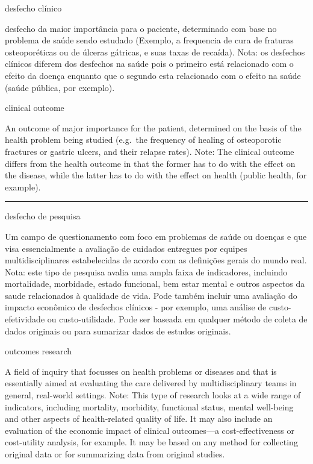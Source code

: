 \documentclass[
]{book}
\begin{document}
desfecho clínico

desfecho da maior importância para o paciente, determinado com base no problema de saúde sendo estudado (Exemplo, a frequencia de cura de fraturas osteoporéticas ou de úlceras gátricas, e suas taxas de recaída). Nota: os desfechos clínicos diferem dos desfechos na saúde pois o primeiro está relacionado com o efeito da doença enquanto que o segundo esta relacionado com o efeito na saúde (saúde pública, por exemplo).

clinical outcome

An outcome of major importance for the patient, determined on the basis of the health problem being studied (e.g.~the frequency of healing of osteoporotic fractures or gastric ulcers, and their relapse rates). Note: The clinical outcome differs from the health outcome in that the former has to do with the effect on the disease, while the latter has to do with the effect on health (public health, for example).

\begin{center}\rule{0.5\linewidth}{0.5pt}\end{center}

desfecho de pesquisa

Um campo de questionamento com foco em problemas de saúde ou doenças e que visa essencialmente a avaliação de cuidados entregues por equipes multidisciplinares estabelecidas de acordo com as definições gerais do mundo real. Nota: este tipo de pesquisa avalia uma ampla faixa de indicadores, incluindo mortalidade, morbidade, estado funcional, bem estar mental e outros aspectos da saude relacionados à qualidade de vida. Pode também incluir uma avaliação do impacto econômico de desfechos clínicos - por exemplo, uma análise de custo-efetividade ou custo-utilidade. Pode ser baseada em qualquer método de coleta de dados originais ou para sumarizar dados de estudos originais.

outcomes research

A field of inquiry that focusses on health problems or diseases and that is essentially aimed at evaluating the care delivered by multidisciplinary teams in general, real-world settings. Note: This type of research looks at a wide range of indicators, including mortality, morbidity, functional status, mental well-being and other aspects of health-related quality of life. It may also include an evaluation of the economic impact of clinical outcomes---a cost-effectiveness or cost-utility analysis, for example. It may be based on any method for collecting original data or for summarizing data from original studies.
\end{document}
